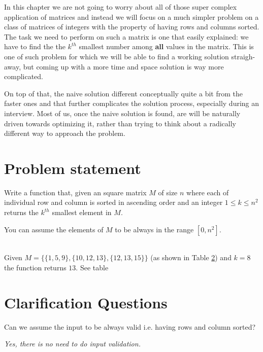 In this chapter we are not going to worry about all of those super complex application of matrices and instead we will focus on a much simpler problem on a class of matrices of integers with the property of having rows and columns sorted. The task we need to perform on such a matrix is one that easily explained: we have to find the the $k^{th}$ smallest number among \textbf{all} values in the matrix.
This is one of such problem for which we will be able to find a working solution straigh-away, but coming up with a more time and space solution is way more complicated. 

On top of that, the naive solution different conceptually  quite a bit from the faster ones and that further complicates the solution process, especially during an interview. Most of us, once the naive solution is found, are will be naturally driven towards optimizing it, rather than trying to think about a radically different way to approach the problem.



\section{Problem statement}
\begin{exercise}
\label{example:kth_smallest_in_sorted_matrix:exercice1}
Write a function that, given an square matrix $M$ of size $n$  where each of individual row and column is sorted in ascending order and an integer $1 \leq k \leq n^2$
returns the $k^{th}$ smallest element in $M$.


You can assume the elements of $M$ to be always in the range $[0,n^2]$.

	\begin{example}
		\label{example:kth_smallest_in_sorted_matrix:example1}
		\hfill \\
		Given $M=\{\{1,5,9\},\{10,12,13\},\{12,13,15\}\}$ (as shown in Table \ref{}) and $k=8$ the function returns $13$. See table
	\end{example}
\end{exercise}




\section{Clarification Questions}

\begin{QandA}
	\item Can we assume the input to be always valid i.e. having rows and column sorted?
	\begin{answered}
		\textit{Yes, there is no need to do input validation.}
	\end{answered}
	
	
\end{QandA}

